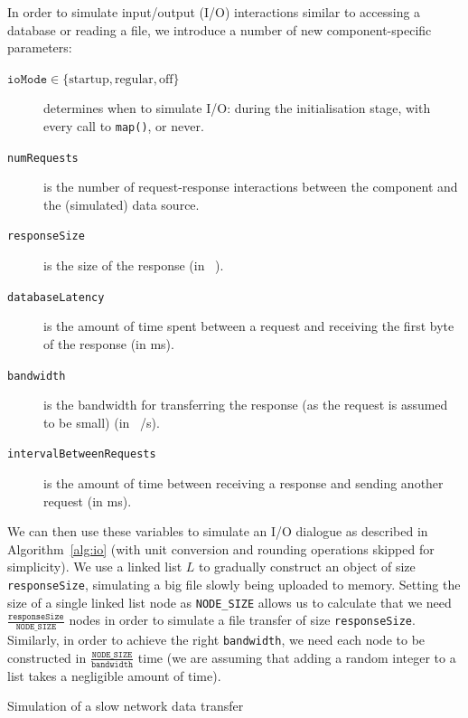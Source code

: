 \documentclass{article}
\begin{document}
In order to simulate input/output (I/O) interactions similar to accessing a
database or reading a file, we introduce a number of new component-specific
parameters:
\begin{description}
\item[$\texttt{ioMode} \in \{ \text{startup}, \text{regular}, \text{off} \}$]
  determines when to simulate I/O: during the initialisation stage, with every
  call to \texttt{map()}, or never.
\item[\texttt{numRequests}] is the number of request-response interactions
  between the component and the (simulated) data source.
\item[\texttt{responseSize}] is the size of the response (in \si{\kibi\byte}).
\item[\texttt{databaseLatency}] is the amount of time spent between a request
  and receiving the first byte of the response (in \si{\milli\second}).
\item[\texttt{bandwidth}] is the bandwidth for transferring the response (as the
  request is assumed to be small) (in
  \si[per-mode=symbol]{\mebi\bit\per\second}).
\item[\texttt{intervalBetweenRequests}] is the amount of time between receiving
  a response and sending another request (in \si{\milli\second}).
\end{description}
We can then use these variables to simulate an I/O dialogue as described in
Algorithm~\ref{alg:io} (with unit conversion and rounding operations skipped for
simplicity). We use a linked list $L$ to gradually construct an object of size
\texttt{responseSize}, simulating a big file slowly being uploaded to memory.
Setting the size of a single linked list node as \texttt{NODE\_SIZE} allows us
to calculate that we need $\frac{\texttt{responseSize}}{\texttt{NODE\_SIZE}}$
nodes in order to simulate a file transfer of size \texttt{responseSize}.
Similarly, in order to achieve the right \texttt{bandwidth}, we need each node
to be constructed in $\frac{\texttt{NODE\_SIZE}}{\texttt{bandwidth}}$ time (we
are assuming that adding a random integer to a list takes a negligible amount of
time).

\begin{algorithm}
  \caption{Simulation of a slow network data transfer}
  \label{alg:io}
\end{algorithm}
\end{document}
